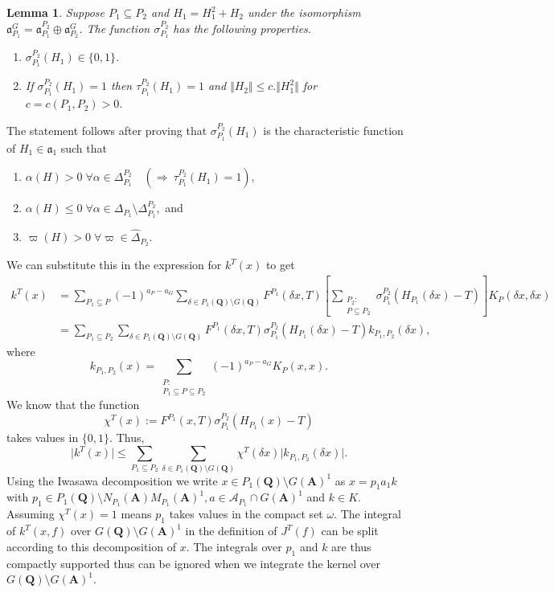 \documentclass[11pt]{amsart}
\def\apg{a_{P} - a_{G}}
\def\A{\mathbf A}
\def\Q{\mathbf Q}
\def\AAA{\mathcal A}	%
\def\aaa{\mathfrak a}
\def\bs{\setminus} 			%
\def\mod#1{\lvert #1 \rvert} %
\def\norm#1{\Vert #1 \Vert} %
\def\se{\subseteq}
\newtheorem{lemma}[theorem]{Lemma}
\theoremstyle{remark}
\begin{document}
\begin{lemma}
	Suppose $P_1 \se P_2$ and $H_1 = H_1^2 + H_2$ under the isomorphism $\aaa_{P_1}^G = \aaa_{P_1}^{P_2} \oplus \aaa_{P_2}^G$. The function $\sigma_{P_1}^{P_2}$ has the following properties. 
	\begin{enumerate}
		\item $\sigma_{P_1}^{P_2}(H_1) \in \{0, 1\}$. 
		\item If $\sigma_{P_1}^{P_2}(H_1) = 1$ then $\tau_{P_1}^{P_2}(H_1) = 1$ and $\norm{H_2} \leq c.\norm{H_1^2}$ for $c = c(P_1, P_2) > 0$. 
	\end{enumerate}
\end{lemma}

The statement follows after proving that $\sigma_{P_1}^{P_2}(H_1)$ is the characteristic function of $H_1 \in \aaa_1$ such that 
\begin{enumerate}[i]
	\item $\alpha(H) > 0 \; \forall \alpha \in \Delta_{P_1}^{P_2} \quad (\Rightarrow \ \tau_{P_1}^{P_2}(H_1) = 1),$
	\item $\alpha(H) \leq 0 \; \forall \alpha \in \Delta_{P_1} \bs \Delta_{P_1}^{P_2},$ and
	\item $\varpi(H) > 0 \; \forall \varpi \in \hat\Delta_{P_2}.$
\end{enumerate}

We can substitute this in the expression for $k^T(x)$ to get
\begin{align*}
	k^T(x) & = \sum_{P_1 \se P} (-1)^{\apg} \sum_{\delta \in P_1(\Q) \bs G(\Q)} F^{P_1}(\delta x, T) 
			\left[ \sum_{\substack{P_2 : \\ P \se P_2}} \sigma_{P_1}^{P_2}(H_{P_1}(\delta x) - T) \right]
			K_P(\delta x, \delta x) \\
			& = \sum_{P_1 \se P_2} \sum_{\delta \in P_1(\Q) \bs G(\Q)} F^{P_1}(\delta x, T) 
			 \sigma_{P_1}^{P_2}(H_{P_1}(\delta x) - T) k_{P_1, P_2}(\delta x),
\end{align*}
where 
\[ k_{P_1, P_2}(x) = \sum_{\substack{P :\\ P_1 \se P \se P_2}} (-1)^{\apg} K_P(x, x). \]
We know that the function 
\[ \chi^T(x) := F^{P_1}(x, T) \sigma_{P_1}^{P_2}(H_{P_1}(x) - T) \]
takes values in $\{0, 1\}$. Thus, 
\[ \mod{k^T(x)} \leq \sum_{P_1 \se P_2} \sum_{\delta \in P_1(\Q) \bs G(\Q)} \chi^T(\delta x) \mod{k_{P_1, P_2}(\delta x)}. \]
Using the Iwasawa decomposition we write $x \in P_1(\Q) \bs G(\A)^1$ as $x = p_1 a_1 k$ with $p_1 \in P_1(\Q) \bs N_{P_1}(\A)M_{P_1}(\A)^1, a \in \AAA_{P_1} \cap G(\A)^1$ and $k \in K$. Assuming $\chi^T(x) = 1$ means $p_1$ takes values in the compact set $\omega$. The integral of $k^T(x, f)$ over $G(\Q)\bs G(\A)^1$ in the definition of $J^T(f)$ can be split according to this decomposition of $x$. The integrals over $p_1$ and $k$ are thus compactly supported thus can be ignored when we integrate the kernel over $G(\Q)\bs G(\A)^1$. 
\end{document}
